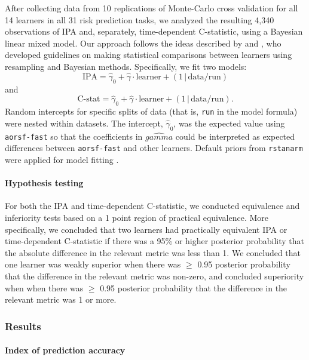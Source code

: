 \documentclass[twoside,11pt]{article}\usepackage[]{graphicx}\usepackage[]{xcolor}
\newcommand{\ie}{that is}
\begin{document}
After collecting data from 10 replications of Monte-Carlo cross validation for all 14 learners in all 31 risk prediction tasks, we analyzed the resulting 4,340 observations of IPA and, separately, time-dependent C-statistic, using a Bayesian linear mixed model. Our approach follows the ideas described by \citet{benavoli2017time} and \citet{tidymodels}, who developed guidelines on making statistical comparisons between learners using resampling and Bayesian methods. Specifically, we fit two models: $$\text{IPA} = \widehat{\gamma}_0 + \widehat{\gamma} \cdot \text{learner} + (1\,|\, \text{data/run}) $$ and $$\text{C-stat} = \widehat{\gamma}_0 + \widehat{\gamma} \cdot \text{learner} + (1\,|\, \text{data/run}).$$ Random intercepts for specific splits of data (\ie, \texttt{run} in the model formula) were nested within datasets. The intercept, $\widehat{\gamma}_0$, was the expected value using \texttt{aorsf-fast} so that the coefficients in $\widehat{gamma}$ could be interpreted as expected differences between \texttt{aorsf-fast} and other learners. Default priors from \texttt{rstanarm} were applied for model fitting \citep{rstanarm}.

\paragraph{Hypothesis testing} For both the IPA and time-dependent C-statistic, we conducted equivalence and inferiority tests based on a 1 point region of practical equivalence. More specifically, we concluded that two learners had practically equivalent IPA or time-dependent C-statistic if there was a 95\% or higher posterior probability that the absolute difference in the relevant metric was less than 1. We concluded that one learner was weakly superior when there was $\geq$ 0.95 posterior probability that the difference in the relevant metric was non-zero, and concluded superiority when when there was $\geq$ 0.95 posterior probability that the difference in the relevant metric was 1 or more.




\subsubsection{Results}

\paragraph{Index of prediction accuracy}
\end{document}
